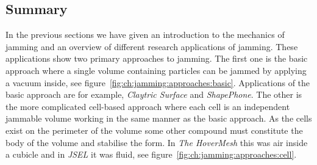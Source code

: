 \subsection{Summary}

In the previous sections we have given an introduction to the mechanics of jamming and an overview of different research applications of jamming.
These applications show two primary approaches to jamming.
The first one is the basic approach where a single volume containing particles can be jammed by applying a vacuum inside, see figure~\ref{fig:ch:jamming:approaches:basic}.
Applications of the basic approach are for example, \emph{Claytric Surface} and \emph{ShapePhone}.
The other is the more complicated cell-based approach where each cell is an independent jammable volume working in the same manner as the basic approach.
As the cells exist on the perimeter of the volume some other compound must constitute the body of the volume and stabilise the form.
In \emph{The HoverMesh} this was air inside a cubicle and in \emph{JSEL} it was fluid, see figure~\ref{fig:ch:jamming:approaches:cell}.

